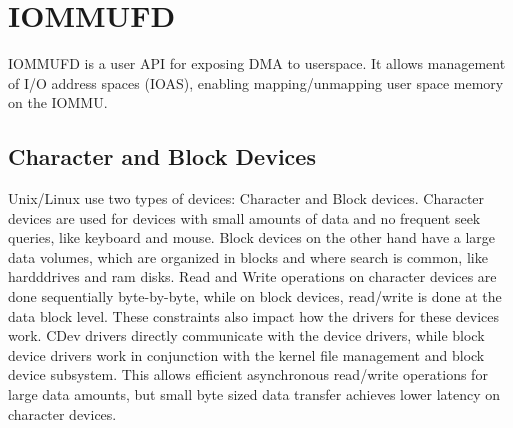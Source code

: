 \section{IOMMUFD}
IOMMUFD is a user API for exposing DMA to userspace.
It allows management of I/O address spaces (IOAS), enabling mapping/unmapping user space memory on the IOMMU.

\subsection{Character and Block Devices}
Unix/Linux use two types of devices: Character and Block devices. Character devices are used for devices with small amounts of data and no frequent seek queries, like keyboard and mouse. Block devices on the other hand have a large data volumes, which are organized in blocks and where search is common, like hardddrives and ram disks.
Read and Write operations on character devices are done sequentially byte-by-byte, while on block devices, read/write is done at the data block level.
These constraints also impact how the drivers for these devices work. CDev drivers directly communicate with the device drivers, while block device drivers work in conjunction with the kernel file management and block device subsystem. This allows efficient asynchronous read/write operations for large data amounts, but small byte sized data transfer achieves lower latency on character devices.